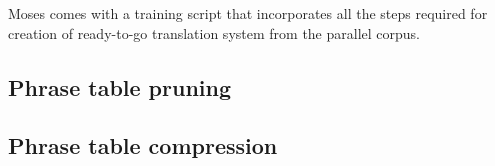
Moses comes with a training script that incorporates all the steps required
for creation of ready-to-go translation system from the parallel corpus.

\subsection{Phrase table pruning}


\subsection{Phrase table compression}

